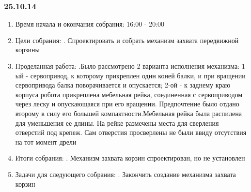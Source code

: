 \documentclass[12pt]{article}
\begin{document}
	        \subsubsection{25.10.14}
	        \begin{enumerate}
	        	\item Время начала и окончания собрания:
	        	16:00 - 20:00
	        	\newline
	        	\item Цели собрания:
	        	. Спроектировать и собрать механизм захвата передвижной корзины
	        	\item Проделанная работа:
	        	.Было рассмотрено 2 варианта исполнения механизма: 1-ый - сервопривод, к которому прикреплен один коней балки, и при вращении сервопривода балка поворачивается и опускается; 2-ой - к заднему краю корпуса робота прикреплена мебельная рейка, соединенная с сервоприводом через леску и опускающаяся при его вращении. Предпочтение было отдано второму в силу его большей компактности.Мебельная рейка была распилена для уменьшения ее длины. На рейке размечены места для сверления отверстий под крепеж. Сам отверстия просверлены не были ввиду отсутствия на тот момент дрели 
	        	\item Итоги собрания:
	        	. Механизм захвата корзин спроектирован, но не установлен
	        	\item Задачи для следующего собрания:
	        	. Закончить создание механизма захвата корзин
	        \end{enumerate}
	        \newpage
\end{document}
